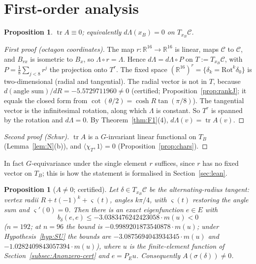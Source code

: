 \documentclass[11pt]{amsart}
\newtheorem{proposition}[theorem]{Proposition}
\theoremstyle{definition}
\theoremstyle{remark}
\newcommand{\R}{\mathbb{R}}
\newcommand{\Oct}{\mathcal{C}}
\newcommand{\tr}{\operatorname{tr}}
\newcommand{\xB}{x_B}
\begin{document}
\section{First-order analysis}\label{sec:first}

\begin{proposition}\label{prop:trA}
$\tr A\equiv0$; equivalently $d\Lambda(\xB)=0$ on $T_{\xB}\Oct$.
\end{proposition}

\begin{proof}[First proof (octagon coordinates)]
The map $r\colon\R^{16}\to\R^{16}$ is linear, maps $\Oct$ to $\Oct$, and $B_{rx}$ is isometric to
$B_x$, so $\Lambda\circ r=\Lambda$. Hence $d\Lambda=d\Lambda\circ P$ on $T:=T_{\xB}\Oct$, with
$P=\frac18\sum_{j<8}r^j$ the projection onto $T^r$. The fixed space $(\R^{16})^r=\{\delta_k=\mathrm{Rot}^k\delta_0\}$
is two-dimensional (radial and tangential). The radial vector is not in $T$, because
$d(\text{angle sum})/dR=-5.5729711960\ne0$ (certified; Proposition~\ref{prop:rankJ}; it equals the
closed form from $\cot(\theta/2)=\cosh R\tan(\pi/8)$). The tangential vector is the infinitesimal
rotation, along which $\Lambda$ is constant. So $T^r$ is spanned by the rotation and
$d\Lambda=0$. By Theorem~\ref{thm:F1}(4), $d\Lambda(v)=\tr A(v)$.
\end{proof}

\begin{proof}[Second proof (Schur)]
$\tr A$ is a $G$-invariant linear functional on $T_B$ (Lemma~\ref{lem:N}(b)), and
$\langle\chi_T,1\rangle=0$ (Proposition~\ref{prop:chars}).
\end{proof}

In fact $G$-equivariance under the single element $r$ suffices, since $r$ has no fixed vector on
$T_B$; this is how the statement is formalised in Section~\ref{sec:lean}.

\begin{proposition}[$A\ne0$; certified]\label{prop:Anonzero}
Let $\delta\in T_{\xB}\Oct$ be the alternating-radius tangent: vertex radii
$R+t(-1)^k+\varsigma(t)$, angles $k\pi/4$, with $\varsigma(t)$ restoring the angle sum and
$\varsigma'(0)=0$. Then there is an exact eigenfunction $e\in E$ with
\[
b_\delta(e,e)\le-3.0383476242423058\cdot m(u)<0
\]
($n=192$; at $n=96$ the bound is $-0.9989201873540878\cdot m(u)$; under Hypothesis~\ref{hyp:SU} the
bounds are $-3.0875694043934345\cdot m(u)$ and $-1.0282409843057394\cdot m(u)$), where $u$ is the finite-element
function of Section~\ref{subsec:Anonzero-cert} and $e=P_Eu$. Consequently $A(\sigma(\delta))\ne0$.
\end{proposition}
\end{document}
